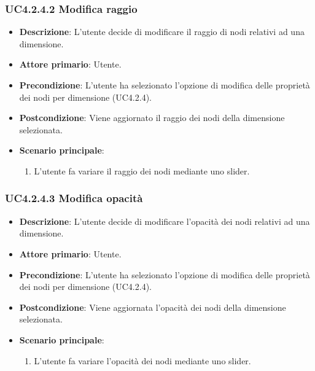 \subsubsection{UC4.2.4.2 Modifica raggio}
\label{subsec:uc4.2.2}
\begin{itemize}
    \item \textbf{Descrizione}: L'utente decide di modificare il raggio di nodi relativi ad una dimensione.
	
    \item \textbf{Attore primario}: Utente.
    
    \item \textbf{Precondizione}:   L'utente ha selezionato l'opzione di modifica delle proprietà dei nodi per dimensione (UC4.2.4).
    \item \textbf{Postcondizione}:  Viene aggiornato il raggio dei nodi della dimensione selezionata.

	\item \textbf{Scenario principale}:
        \begin{enumerate}
            \item L'utente fa variare il raggio dei nodi mediante uno slider.
        \end{enumerate}
\end{itemize}

\subsubsection{UC4.2.4.3 Modifica opacità}
\label{subsec:uc4.2.3}
\begin{itemize}
    \item \textbf{Descrizione}:  L'utente decide di modificare l'opacità dei nodi relativi ad una dimensione.

	
    \item \textbf{Attore primario}: Utente.

    \item \textbf{Precondizione}: L'utente ha selezionato l'opzione di modifica delle proprietà dei nodi per dimensione (UC4.2.4).
    \item \textbf{Postcondizione}:  Viene aggiornata l'opacità dei nodi della dimensione selezionata.

	\item \textbf{Scenario principale}:
        \begin{enumerate}
            \item L'utente fa variare l'opacità dei nodi mediante uno slider.
        \end{enumerate}
\end{itemize}

